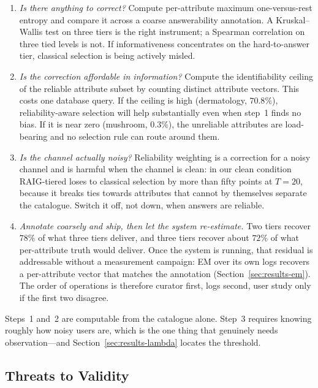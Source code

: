 \begin{enumerate}
\item \emph{Is there anything to correct?} Compute per-attribute maximum
one-versus-rest entropy and compare it across a coarse answerability
annotation. A Kruskal--Wallis test on three tiers is the right instrument; a
Spearman correlation on three tied levels is not. If informativeness
concentrates on the hard-to-answer tier, classical selection is being actively
misled.
\item \emph{Is the correction affordable in information?} Compute the
identifiability ceiling of the reliable attribute subset by counting distinct
attribute vectors. This costs one database query. If the ceiling is high
(dermatology, $70.8\%$), reliability-aware selection will help substantially
even when step~1 finds no bias. If it is near zero (mushroom, $0.3\%$), the
unreliable attributes are load-bearing and no selection rule can route around
them.
\item \emph{Is the channel actually noisy?} Reliability weighting is a
correction for a noisy channel and is harmful when the channel is clean: in our
clean condition RAIG-tiered loses to classical selection by more than
fifty points at $T=20$, because it breaks ties towards attributes that cannot
by themselves separate the catalogue. Switch it off, not down, when answers are
reliable.
\item \emph{Annotate coarsely and ship, then let the system re-estimate.} Two
tiers recover $78\%$ of what three tiers deliver, and three tiers recover about
$72\%$ of what per-attribute truth would deliver. Once the system is running,
that residual is addressable without a measurement campaign: EM over its own
logs recovers a per-attribute vector that matches the annotation
(Section~\ref{sec:results-em}). The order of operations is therefore curator
first, logs second, user study only if the first two disagree.
\end{enumerate}

Steps~1 and~2 are computable from the catalogue alone. Step~3 requires knowing
roughly how noisy users are, which is the one thing that genuinely needs
observation---and Section~\ref{sec:results-lambda} locates the threshold.

\subsection{Threats to Validity}

